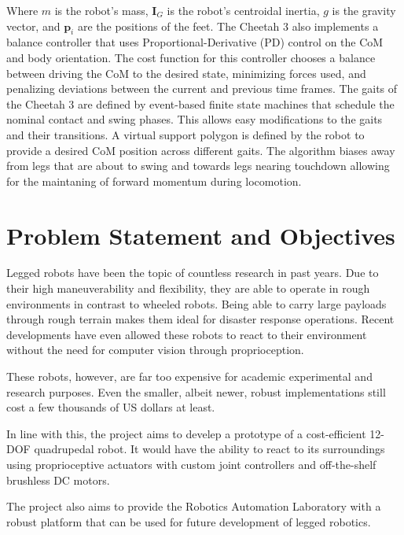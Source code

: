 \documentclass[english]{upeeei}
\begin{document}
Where $m$ is the robot's mass, $\mathbf{I}_G$ is the robot's centroidal inertia, $g$ is the gravity vector, and $\mathbf{p}_i$ are the positions of the feet. The Cheetah 3 also implements a balance controller that uses Proportional-Derivative (PD) control on the CoM and body orientation. The cost function for this controller chooses a balance between driving the CoM to the desired state, minimizing forces used, and penalizing deviations between the current and previous time frames. The gaits of the Cheetah 3 are defined by event-based finite state machines that schedule the nominal contact and swing phases. This allows easy modifications to the gaits and their transitions. A virtual support polygon is defined by the robot to provide a desired CoM position across different gaits. The algorithm biases away from legs that are about to swing and towards legs nearing touchdown allowing for the maintaning of forward momentum during locomotion.

\cleardoublepage{}

\chapter{Problem Statement and Objectives \label{cha:ProbStatement}}

Legged robots have been the topic of countless research in past years. Due to their high maneuverability and flexibility, they are able to operate in rough environments in contrast to wheeled robots. Being able to carry large payloads through rough terrain makes them ideal for disaster response operations. Recent developments have even allowed these robots to react to their environment without the need for computer vision through proprioception.

These robots, however, are far too expensive for academic experimental and research purposes. Even the smaller, albeit newer, robust implementations still cost a few thousands of US dollars at least. 

In line with this, the project aims to develep a prototype of a cost-efficient 12-DOF quadrupedal robot. It would have the ability to react to its surroundings using proprioceptive actuators with custom joint controllers and off-the-shelf brushless DC motors.

The project also aims to provide the Robotics Automation Laboratory with a robust platform that can be used for future development of legged robotics.

\cleardoublepage{}
\end{document}
